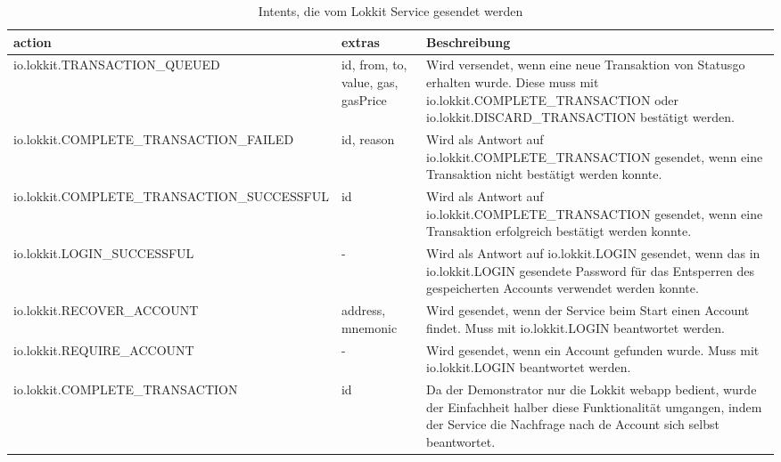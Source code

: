 \begin{table}[H]
\centering
\caption{Intents, die vom Lokkit Service gesendet werden}
\label{tbl:LokktService_SendIntents}
\begin{tabular}{@{}L{3cm}L{2cm}L{10cm}@{}}
\toprule
action & extras & Beschreibung \\ \midrule
io.lokkit.\newline{}TRANSACTION\newline{}\_QUEUED\newline{} & id, from, to, value, gas, gasPrice & Wird versendet, wenn eine neue Transaktion von Statusgo erhalten wurde. Diese muss mit io.lokkit.COMPLETE\_TRANSACTION oder io.lokkit.DISCARD\_TRANSACTION bestätigt werden. \\\midrule
io.lokkit.\newline{}COMPLETE\newline{}\_TRANSACTION\newline{}\_FAILED & id, reason & Wird als Antwort auf io.lokkit.COMPLETE\_TRANSACTION gesendet, wenn eine Transaktion nicht bestätigt werden konnte. \\\midrule
io.lokkit.\newline{}COMPLETE\newline{}\_TRANSACTION\newline{}\_SUCCESSFUL & id & Wird als Antwort auf io.lokkit.COMPLETE\_TRANSACTION gesendet, wenn eine Transaktion erfolgreich bestätigt werden konnte. \\\midrule
io.lokkit.\newline{}LOGIN\newline{}\_SUCCESSFUL & - & Wird als Antwort auf io.lokkit.LOGIN gesendet, wenn das in io.lokkit.LOGIN gesendete Password für das Entsperren des gespeicherten Accounts verwendet werden konnte. \\\midrule
io.lokkit.\newline{}RECOVER\newline{}\_ACCOUNT & address, mnemonic & Wird gesendet, wenn der Service beim Start einen Account findet. Muss mit io.lokkit.LOGIN beantwortet werden. \\\midrule
io.lokkit.\newline{}REQUIRE\newline{}\_ACCOUNT & - & Wird gesendet, wenn ein Account gefunden wurde. Muss mit io.lokkit.LOGIN beantwortet werden. \\\midrule
io.lokkit.\newline{}COMPLETE\newline{}\_TRANSACTION & id & Da der Demonstrator nur die Lokkit webapp bedient, wurde der Einfachheit halber diese Funktionalität umgangen, indem der Service die Nachfrage nach de Account sich selbst beantwortet. \\
\bottomrule
\end{tabular}
\end{table}

